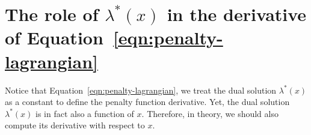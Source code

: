




\section{The role of $\lambda^*(x)$ in the derivative of Equation~\cref{eqn:penalty-lagrangian}}
Notice that Equation~\cref{eqn:penalty-lagrangian}, we treat the dual solution $\lambda^*(x)$ as a constant to define the penalty function derivative. Yet, the dual solution $\lambda^*(x)$ is in fact also a function of $x$. Therefore, in theory, we should also compute its derivative with respect to $x$.

